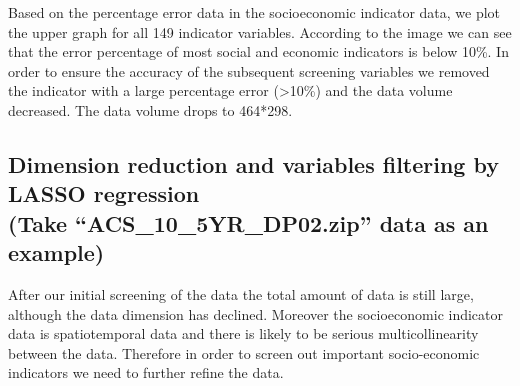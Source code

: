\documentclass{mcmthesis}
\begin{document}
Based on the percentage error data in the socioeconomic indicator data, we plot the upper graph for all 149 indicator variables.  According to the image we can see that the error percentage of most social and economic indicators is below 10\%. In order to ensure the accuracy of the subsequent screening variables we removed the indicator with a large percentage error (>10\%) and the data volume decreased.  The data volume drops to 464*298.

\subsection{Dimension reduction and variables filtering by LASSO regression\\\small{(Take “ACS\_10\_5YR\_DP02.zip” data as an example)}}

After our initial screening of the data the total amount of data is still large, although the data dimension has declined. Moreover the socioeconomic indicator data is spatiotemporal data and there is likely to be serious multicollinearity between the data. Therefore in order to screen out important socio-economic indicators we need to further refine the data.
\end{document}
